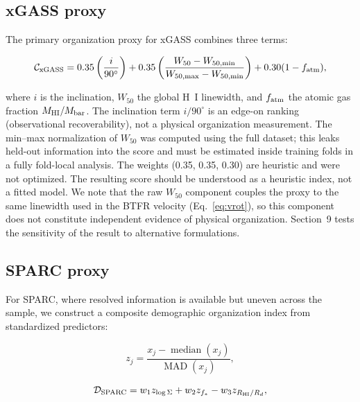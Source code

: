 \documentclass[11pt]{article}
\begin{document}
\subsection{xGASS proxy}

The primary organization proxy for xGASS combines three terms:

\begin{equation}
\mathcal{C}_{\rm xGASS} =
0.35 \left(\frac{i}{90^\circ}\right)
+ 0.35 \left(\frac{W_{50} - W_{50,\min}}{W_{50,\max} - W_{50,\min}}
\right)
+ 0.30 (1 - f_{\rm atm}),
\end{equation}

where $i$ is the inclination, $W_{50}$ the global H~I linewidth, and $f_{\rm atm}$ the atomic gas fraction $M_{\rm HI}/M_{\rm bar}$. The inclination term $i/90^\circ$ is an edge-on ranking (observational recoverability), not a physical organization measurement. The min--max normalization of $W_{50}$ was computed using the full dataset; this leaks held-out information into the score and must be estimated inside training folds in a fully fold-local analysis. The weights (0.35, 0.35, 0.30) are heuristic and were not optimized. The resulting score should be understood as a heuristic index, not a fitted model. We note that the raw $W_{50}$ component couples the proxy to the same linewidth used in the BTFR velocity (Eq.~\ref{eq:vrot}), so this component does not constitute independent evidence of physical organization. Section~9 tests the sensitivity of the result to alternative formulations.

\subsection{SPARC proxy}

For SPARC, where resolved information is available but uneven across the sample, we construct a composite demographic organization index from standardized predictors:

\begin{equation}
z_j = \frac{x_j - \operatorname{median}(x_j)}{\operatorname{MAD}(x_j)},
\end{equation}

\begin{equation}
\mathcal{D}_{\rm SPARC} = w_1 z_{\log\Sigma} + w_2 z_{f_*} - w_3 z_{R_{\rm HI}/R_d},
\end{equation}
\end{document}
